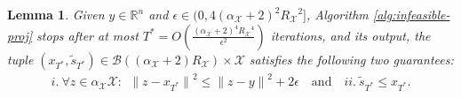 \documentclass[a4paper,12pt]{article}
\newtheorem{lemma} {Lemma}
\newcommand{\mX}{\mathcal{X}}
\newcommand{\mB}{\mathcal{B}}
\newcommand{\reals}{\mathbb{R}}
\begin{document}
\begin{lemma}
\label{lemma: infesProj}
Given $y\in\reals^n$ and $\epsilon \in (0,4{(\alpha_\mX +2)}^2 {R_\mX}^2]$, Algorithm \ref{alg:infeasible-proj} stops after at most $T^* = O \left( \frac{{(\alpha_\mX +2)}^4 {R_\mX}^4}{\epsilon^2}\right)$ iterations, and its output, the tuple $(x_{T^*},\tilde{s}_{T^*})\in\mB((\alpha_{\mX}+2)R_{\mX})\times\mX$ satisfies the following two guarantees: 
\begin{align}\label{eq:infesProj:1}
i.~\forall z \in \alpha_\mX \mX: ~~ {\|z-x_{T^*}\|}^2 \leq {\|z-y\|}^2 +2\epsilon \quad \textrm{and} \quad ii.~\tilde{s}_{T^*} \leq x_{T^*}.
\end{align}
\end{lemma}
\end{document}
